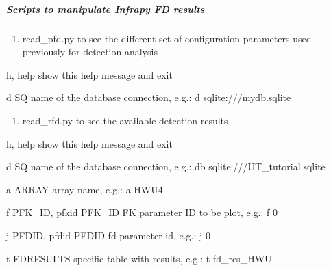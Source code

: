 \documentclass[letterpaper,10pt,english]{sphinxmanual}
\begin{document}
\noindent{}

\noindent{}

\noindent{}


\subparagraph{Scripts to manipulate Infrapy FD results}
\label{\detokenize{scripts:scripts-to-manipulate-infrapy-fd-results}}\begin{enumerate}
%
\item {} 
read\_pfd.py to see the different set of configuration parameters used previously for detection analysis

\end{enumerate}

\begin{DUlineblock}{0em}
\item[] \sphinxhyphen{}h, \textendash{}help  show this help message and exit
\item[] \sphinxhyphen{}d SQ       name of the database connection, e.g.: \sphinxhyphen{}d sqlite:///mydb.sqlite
\end{DUlineblock}

\begin{sphinxVerbatim}[commandchars=\\\{\}]
  \PYG{p}{[}\PYG{p}{]}  
\end{sphinxVerbatim}
\begin{enumerate}
%
\setcounter{enumi}{1}
\item {} 
read\_rfd.py to see the available detection results

\end{enumerate}

\begin{DUlineblock}{0em}
\item[] \sphinxhyphen{}h, \textendash{}help            show this help message and exit
\item[] \sphinxhyphen{}d SQ                 name of the database connection, e.g.: \sphinxhyphen{}db sqlite:///UT\_tutorial.sqlite
\item[] \sphinxhyphen{}a ARRAY              array name, e.g.: \sphinxhyphen{}a HWU4
\item[] \sphinxhyphen{}f PFK\_ID, \textendash{}pfkid PFK\_ID FK parameter ID to be plot, e.g.: \sphinxhyphen{}f 0
\item[] \sphinxhyphen{}j PFDID, \textendash{}pfdid PFDID fd parameter id, e.g.: \sphinxhyphen{}j 0
\item[] \sphinxhyphen{}t FDRESULTS          specific table with results, e.g.: \sphinxhyphen{}t fd\_res\_HWU
\end{DUlineblock}
\end{document}
